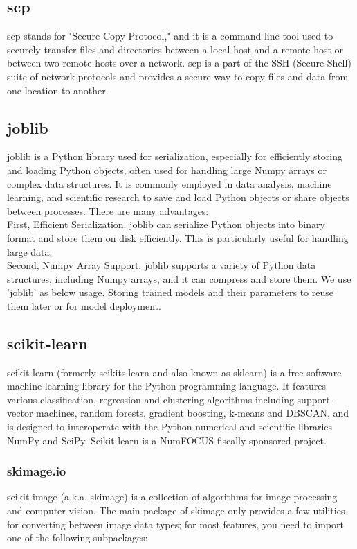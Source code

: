 \subsection{\textbf{scp}}
scp stands for "Secure Copy Protocol," and it is a command-line tool used to securely transfer files and directories between a local host and a remote host or between two remote hosts over a network. scp is a part of the SSH (Secure Shell) suite of network protocols and provides a secure way to copy files and data from one location to another.\\
\subsection{\textbf{joblib}}
joblib is a Python library used for serialization, especially for efficiently storing and loading Python objects, often used for handling large Numpy arrays or complex data structures. It is commonly employed in data analysis, machine learning, and scientific research to save and load Python objects or share objects between processes. There are many advantages: \\
First, Efficient Serialization. joblib can serialize Python objects into binary format and store them on disk efficiently. This is particularly useful for handling large data.
\\Second, Numpy Array Support. joblib supports a variety of Python data structures, including Numpy arrays, and it can compress and store them. We use 'joblib' as below usage. Storing trained models and their parameters to reuse them later or for model deployment. \\

\subsection{\textbf{scikit-learn}}
\cite{scikit-learn}
scikit-learn (formerly scikits.learn and also known as sklearn) is a free software machine learning library for the Python programming language. It features various classification, regression and clustering algorithms including support-vector machines, random forests, gradient boosting, k-means and DBSCAN, and is designed to interoperate with the Python numerical and scientific libraries NumPy and SciPy. Scikit-learn is a NumFOCUS fiscally sponsored project.\\
\subsubsection{\textbf{skimage.io}}
scikit-image (a.k.a. skimage) is a collection of algorithms for image processing and computer vision.
The main package of skimage only provides a few utilities for converting between image data types; for most features, you need to import one of the following subpackages:\\
